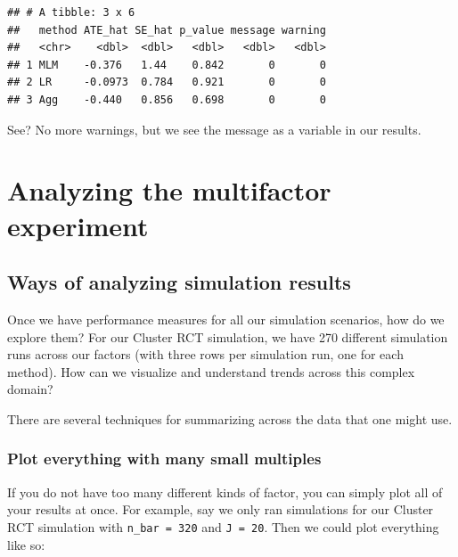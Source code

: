 \documentclass[
]{book}
\begin{document}
\begin{verbatim}
## # A tibble: 3 x 6
##   method ATE_hat SE_hat p_value message warning
##   <chr>    <dbl>  <dbl>   <dbl>   <dbl>   <dbl>
## 1 MLM    -0.376   1.44    0.842       0       0
## 2 LR     -0.0973  0.784   0.921       0       0
## 3 Agg    -0.440   0.856   0.698       0       0
\end{verbatim}

See? No more warnings, but we see the message as a variable in our results.

\chapter{Analyzing the multifactor experiment}\label{analyzing-the-multifactor-experiment}

\section{Ways of analyzing simulation results}\label{ways-of-analyzing-simulation-results}

Once we have performance measures for all our simulation scenarios, how do we explore them?
For our Cluster RCT simulation, we have 270 different simulation runs across our factors (with three rows per simulation run, one for each method).
How can we visualize and understand trends across this complex domain?

There are several techniques for summarizing across the data that one might use.

\subsection{Plot everything with many small multiples}\label{plot-everything-with-many-small-multiples}

If you do not have too many different kinds of factor, you can simply plot all of your results at once.
For example, say we only ran simulations for our Cluster RCT simulation with \texttt{n\_bar\ =\ 320} and \texttt{J\ =\ 20}.
Then we could plot everything like so:
\end{document}
